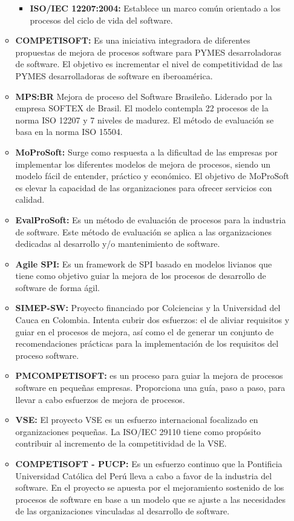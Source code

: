 \documentclass[a4paper,12pt]{article}
\begin{document}
\begin{enumerate}
\begin{itemize}
\begin{itemize}
   \item \textbf{ISO/IEC 12207:2004: } Establece un marco común orientado a los procesos del ciclo de vida del software.
  \end{itemize}
  \item \textbf{COMPETISOFT: } Es una iniciativa integradora de diferentes propuestas de mejora de procesos software para PYMES desarroladoras de software.
  El objetivo es incrementar el nivel de competitividad de las PYMES desarrolladoras de software en iberoamérica.
  \item \textbf{MPS:BR} Mejora de proceso del Software Brasileño. Liderado por la empresa SOFTEX de Brasil. El modelo contempla 22 procesos de la norma ISO 12207 y 7 niveles de madurez.
  El método de evaluación se basa en la norma ISO 15504.
  \item \textbf{MoProSoft: } Surge como respuesta a la dificultad de las empresas por implementar los diferentes modelos de mejora de procesos, siendo un modelo fácil de entender, práctico y económico.
  El objetivo de MoProSoft es elevar la capacidad de las organizaciones para ofrecer servicios con calidad.
  \item \textbf{EvalProSoft: } Es un método de evaluación de procesos para la industria de software. Este método de evaluación se aplica a las organizaciones 
  dedicadas al desarrollo y/o mantenimiento de software.
  \item \textbf{Agile SPI: } Es un framework de SPI basado en modelos livianos que tiene como objetivo guiar la mejora de los procesos de desarrollo de software de forma ágil.
  \item \textbf{SIMEP-SW: } Proyecto financiado por Colciencias y la Universidad del Cauca en Colombia. Intenta cubrir dos esfuerzos: el de aliviar requisitos y guiar en el procesos de mejora, así como
  el de generar un conjunto de recomendaciones prácticas para la implementación de los requisitos del proceso software.
  \item \textbf{PMCOMPETISOFT: } es un proceso para guiar la mejora de procesos software en pequeñas empresas. Proporciona una guía, paso a paso, para llevar a cabo esfuerzos de 
  mejora de procesos.
  \item \textbf{VSE: } El proyecto VSE es un esfuerzo internacional focalizado en organizaciones pequeñas. La ISO/IEC 29110 tiene como propósito contribuir al incremento de la competitividad de la VSE.
  \item \textbf{COMPETISOFT - PUCP: } Es un esfuerzo continuo que la Pontificia Universidad Católica del Perú lleva a cabo a favor de la industria del software. En el proyecto se apuesta por
  el mejoramiento sostenido de los procesos de software en base a un modelo que se ajuste a las necesidades de las organizaciones vinculadas al desarrollo de software.
  
 \end{itemize}

 
\end{enumerate}
\end{document}
